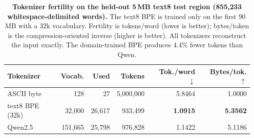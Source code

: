 \begin{table}[!htbp]  %
  \centering
  \small
  \caption{\textbf{Tokenizer fertility on the held-out 5\,MB text8 test region
  (855{,}233 whitespace-delimited words).} The text8 BPE is trained only on the
  first 90\,MB with a 32k vocabulary. Fertility is tokens/word (lower is
  better); bytes/token is the compression-oriented inverse (higher is
  better). All tokenizers reconstruct the input exactly. The domain-trained BPE
  produces 4.4\% fewer tokens than Qwen.}
  \label{tab:tokenizer-fertility}
  \begin{tabular}{@{}lrrrrr@{}}
    \toprule
    Tokenizer & Vocab. & Used & Tokens & Tok./word $\downarrow$ & Bytes/tok. $\uparrow$ \\
    \midrule
    ASCII byte & 128 & 27 & 5{,}000{,}000 & 5.8464 & 1.0000 \\
    text8 BPE (32k) & 32{,}000 & 26{,}617 & 933{,}499 & \textbf{1.0915} & \textbf{5.3562} \\
    Qwen2.5 & 151{,}665 & 25{,}798 & 976{,}828 & 1.1422 & 5.1186 \\
    \bottomrule
  \end{tabular}
\end{table}
